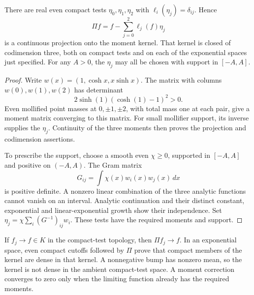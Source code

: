 \begin{proposition}
\label{v4-arith:weil:prop:moment-projection}
There are real even compact tests \(\eta_0,\eta_1,\eta_2\) with
\(\ell_i(\eta_j)=\delta_{ij}\). Hence
\begin{equation}
 \Pi f=f-\sum_{j=0}^2\ell_j(f)\eta_j
 \label{v4-arith:weil:eq:moment-projection}
\end{equation}
is a continuous projection onto the moment kernel. That kernel is closed
of codimension three, both on compact tests and on each of the exponential
spaces just specified. For any \(A>0\), the \(\eta_j\) may all be chosen
with support in \([-A,A]\).
\end{proposition}
\begin{proof}
Write \(w(x)=(1,\cosh x,x\sinh x)\).
The matrix with columns \(w(0),w(1),w(2)\) has determinant
\[
 2\sinh(1)(\cosh(1)-1)^2>0.
\]
Even mollified point masses at \(0,\pm1,\pm2\), with total mass
one at each pair, give a moment matrix converging to this matrix.
For small mollifier support, its inverse supplies the \(\eta_j\).
Continuity of the three moments then proves the projection and
codimension assertions.

To prescribe the support, choose a smooth even \(\chi\ge0\), supported
in \([-A,A]\) and positive on \((-A,A)\). The Gram matrix
\[
 G_{ij}=\int\chi(x)w_i(x)w_j(x)\,dx
\]
is positive definite. A nonzero linear combination of the three analytic
functions cannot vanish on an interval. Analytic continuation and their
distinct constant, exponential and linear-exponential growth show their
independence. Set
\(\eta_j=\chi\sum_i(G^{-1})_{ij}w_i\).
These tests have the required moments and support.
\end{proof}

If \(f_j\to f\in K\) in the compact-test topology, then
\(\Pi f_j\to f\). In an exponential space, even compact cutoffs followed
by \(\Pi\) prove that compact members of the kernel are dense in that
kernel. A nonnegative bump has nonzero mean, so the kernel is not dense
in the ambient compact-test space. A moment correction converges to zero
only when the limiting function already has the required moments.

